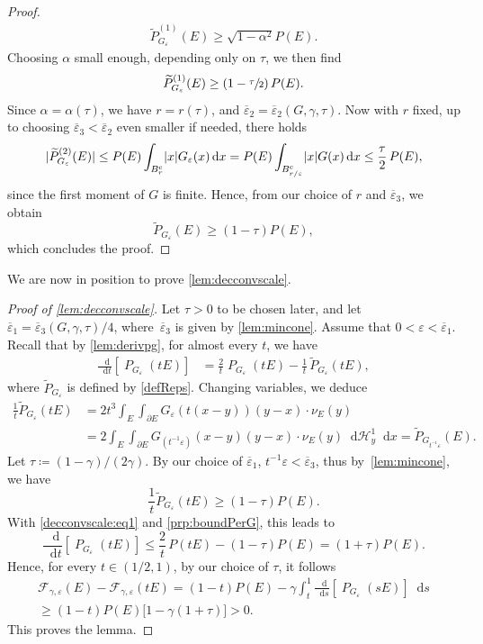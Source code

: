 \documentclass[JEP,XML,SOM,Unicode,published]{cedram}
\numberwithin{equation}{section}
\theoremstyle{plain}
\theoremstyle{definition}
\newcommand{\dd}{\mathop{}\mathopen{}\mathrm{d}}
\newcommand{\dx}{\mathop{}\mathopen{}\mathrm{d}x}
\newcommand{\dt}{\mathop{}\mathopen{}\mathrm{d}t}
\newcommand{\dH}{\mathop{}\mathopen{}\mathrm{d}\mathscr{H}}
\newcommand{\calF}{{\mathcal{F}}}
\let\eps\varepsilon
\let\ol\overline
\let\wt\widetilde
\newcommand{\compl}{{\mathrm{c}}}
\DeclareMathOperator{\Per}{\mathit{P}}
\DeclarePairedDelimiter{\abs}{\lvert}{\rvert}
\begin{document}
\begin{proof}
\[\begin{aligned}
\wt{P}_{G_\eps}^{(1)}(E)
\geq \sqrt{1-\alpha^2}P(E).
\end{aligned}
\]
Choosing $\alpha$ small enough, depending only on $\tau$, we then find
\[
\wt{P}_{G_\eps}^{(1)}(E)\geq \left(1-\sfrac{\tau}{2}\right)P(E).
\]
Since $\alpha=\alpha(\tau)$, we have $r=r(\tau)$, and $\ol{\eps}_2=\ol{\eps}_2(G,\gamma,\tau)$.
Now with $r$ fixed, up to choosing $\ol{\eps}_3<\ol{\eps}_2$ even smaller if needed, there
holds
\[
\abs{\wt{P}_{G_\eps}^{(2)}(E)} \leq P(E)\int_{B_r^\compl} \abs{x}G_\eps(x)\dx
= P(E)\int_{B_{r/\eps}^\compl} \abs{x}G(x)\dx \leq \frac{\tau}{2}\,P(E),
\]
since the first moment of $G$ is finite. Hence, from our choice of $r$ and $\ol{\eps}_3$, we obtain
\[
\wt{P}_{G_\eps}(E)\geq (1-\tau)P(E),
\]
which concludes the proof.
\end{proof}

We are now in position to prove \cref{lem:decconvscale}.

\begin{proof}[Proof of {\cref{lem:decconvscale}}]
Let $\tau>0$ to be chosen later, and let $\ol{\eps}_1=\ol{\eps}_3(G,\gamma,\tau)/4$, where~$\ol{\eps}_3$ is given by \cref{lem:mincone}. Assume that $0<\eps<\ol{\eps}_1$.
Recall that by \cref{lem:derivpg}, for almost every $t$, we have
\begin{equation}\label{decconvscale:eq1}
\begin{aligned}
\frac{\dd}{\dt} \left[\Per_{G_\eps}(tE)\right]
&= \frac{2}{t}\Per_{G_\eps}(tE)-\frac{1}{t}\,\wt{P}_{G_\eps}(tE),
\end{aligned}
\end{equation}
where $\wt{P}_{G_\eps}$ is defined by \cref{defReps}.
Changing variables, we deduce
\[
\begin{aligned}
\frac{1}{t}\wt{P}_{G_\eps}(tE)
&=2t^3\int_E\int_{\partial E} G_\eps(t(x-y))(y-x)\cdot\nu_E(y)\\
&=2\int_E\int_{\partial E} G_{(t^{-1}\eps)}(x-y)(y-x)\cdot\nu_E(y) \dH_y^1\dx
=\wt{P}_{G_{t^{-1}\eps}}(E).
\end{aligned}
\]
Let $\tau\coloneqq(1-\gamma)/(2\gamma)$. By our choice of $\ol{\eps}_1$,
$t^{-1}\eps<\ol{\eps}_3$, thus by~\cref{lem:mincone}, we have
\[
\frac{1}{t}\wt{P}_{G_\eps}(tE)\geq (1-\tau)P(E).
\]
With \cref{decconvscale:eq1} and \cref{prp:boundPerG}, this leads to
\[
\frac{\dd}{\dt} \left[\Per_{G_\eps}(tE)\right]
\leq \frac{2}{t}\,P(tE)-(1-\tau)P(E)
= (1+\tau)P(E).
\]
Hence, for every $t\in(1/2,1)$, by our choice of $\tau$, it follows\vspace*{-3pt}
\begin{multline*}
\calF_{\gamma,\eps}(E)-\calF_{\gamma,\eps}(tE)
=(1-t) P(E)-\gamma\int_t^1 \frac{\dd}{\dd s} \left[\Per_{G_\eps}(sE)\right] \dd s\\
\geq (1-t)P(E)\big[1-\gamma(1+\tau)\big]>0.
\end{multline*}
This proves the lemma.
\end{proof}
\end{document}
